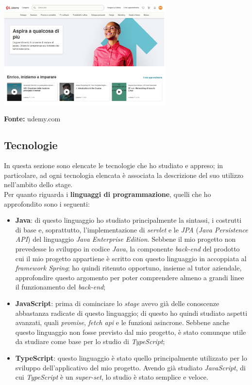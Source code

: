 \begin{minipage}{\linewidth}
  \centering
    \includegraphics[height=5.5cm]{immagini/udemy}
  \caption*{\textbf{Fonte:} udemy.com}
\end{minipage}

\subsection{Tecnologie}

In questa sezione sono elencate le tecnologie che ho studiato e appreso; in particolare, ad ogni tecnologia elencata è associata la descrizione del suo utilizzo nell'ambito dello stage. \\
Per quanto riguarda i \textbf{linguaggi di programmazione}, quelli che ho approfondito sono i seguenti:

\begin{itemize}
  \item \textbf{Java}: di questo linguaggio ho studiato principalmente la sintassi, i costrutti di base e, soprattutto, l'implementazione di \textit{servlet} e le \textit{JPA} (\textit{Java Persistence API}) del linguaggio \textit{Java Enterprise Edition}. Sebbene il mio progetto non prevedesse lo sviluppo in codice \textit{Java}, la componente \textit{back-end} del prodotto cui il mio progetto appartiene è scritto con questo linguaggio in accoppiata al \textit{framework Spring}; ho quindi ritenuto opportuno, insieme al tutor aziendale, approfondire questo argomento per poter comprendere almeno a grandi linee il funzionamento del \textit{back-end};
  \item \textbf{JavaScript}: prima di cominciare lo \textit{stage} avevo già delle conoscenze abbastanza radicate di questo linguaggio; di questo ho quindi studiato aspetti avanzati, quali \textit{promise}, \textit{fetch api} e le funzioni asincrone. Sebbene anche questo linguaggio non fosse previsto dal mio progetto, è stato comunque utile da studiare come base per lo studio di \textit{TypeScript};
  \item \textbf{TypeScript}: questo linguaggio è stato quello principalmente utilizzato per lo sviluppo dell'applicativo del mio progetto. Avendo già studiato \textit{JavaScript}, di cui \textit{TypeScript} è un \textit{super-set}, lo studio è stato semplice e veloce.
\end{itemize}

